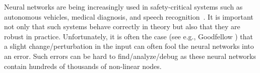 









Neural networks are being increasingly used in safety-critical systems such as autonomous vehicles, medical diagnosis, and speech recognition~\cite{bojarski2016end,amato2013artificial,hinton2012deep}. It is important not only that such systems behave correctly in theory but also that they are robust in practice. Unfortunately, it is often the case (see e.g., Goodfellow \cite{goodfellow2014explaining}) that a slight change/perturbation in the input can often fool the neural networks into an error. Such errors can be hard to find/analyze/debug as these neural networks contain hundreds of thousands of non-linear nodes.

